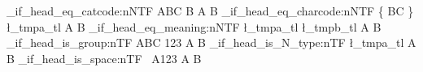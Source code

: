 \documentclass{article}
\begin{document}
\ExplSyntaxOn
\tl_if_head_eq_catcode:nNTF 
  { ABC } B { A } { B }
\tl_if_head_eq_charcode:nNTF
  { \{ BC \} } \l_tmpa_tl { A } { B }
\tl_if_head_eq_meaning:nNTF
  { \l_tmpa_tl } \l_tmpb_tl { A } { B }
\tl_if_head_is_group:nTF
  { { ABC } 123 } { A } { B }
\tl_if_head_is_N_type:nTF
  { \l_tmpa_tl } { A } { B }
\tl_if_head_is_space:nTF
 { ~A123 } { A } { B }
\ExplSyntaxOff
\end{document}

